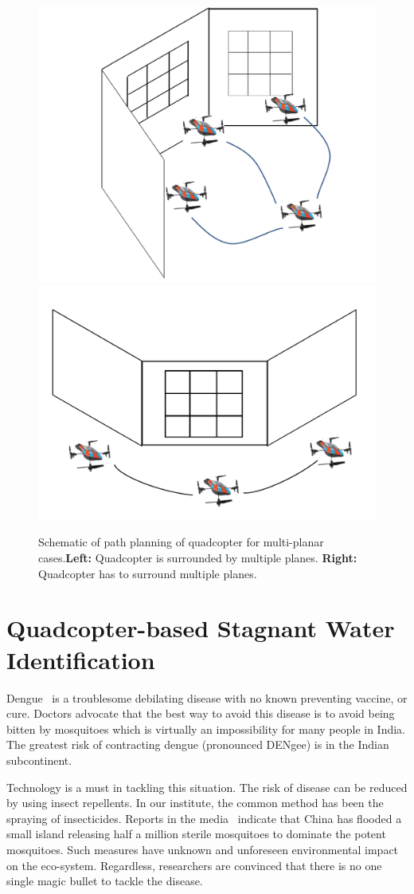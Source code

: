 \documentclass[11pt]{article}
\begin{document}
\begin{figure}[h!]
\centering
\includegraphics[width=0.45\linewidth]{furtherWork/pathInner}
\includegraphics[width=0.45\linewidth]{furtherWork/pathOuter}
\caption{Schematic of path planning of quadcopter for multi-planar
cases.\textbf{Left:} Quadcopter is surrounded by multiple planes. 
\textbf{Right:} Quadcopter has to surround multiple planes.}
\label{fig:pathInnerOuter}
\end{figure}

\section{Quadcopter-based Stagnant Water Identification}

Dengue~\cite{WHO15Dengue} is a troublesome debilating disease with no
known preventing vaccine, or cure. Doctors advocate that the best way
to avoid this disease is to avoid being bitten by mosquitoes which is
virtually an impossibility for many people in India.  The greatest
risk of contracting dengue (pronounced DENgee) is in the Indian
subcontinent.  

Technology is a must in tackling this situation.  The risk of disease
can be reduced by using insect repellents. In our institute, the
common method has been the spraying of insecticides.  Reports in the
media~\cite{china} indicate that China has flooded a small island
releasing half a million sterile mosquitoes to dominate the potent
mosquitoes. Such measures have unknown and unforeseen environmental
impact on the eco-system. Regardless, researchers are convinced that
there is no one single magic bullet to tackle the disease. 
\end{document}
